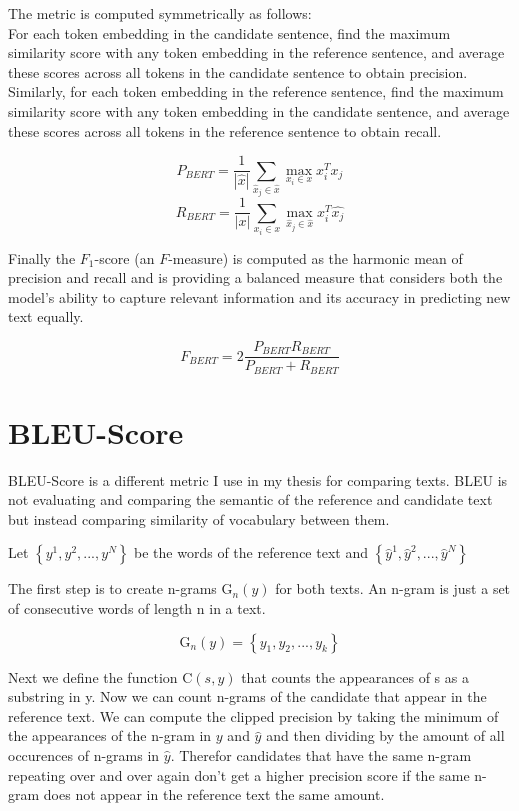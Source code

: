 The metric is computed symmetrically as follows:\\

For each token embedding in the candidate sentence, find the maximum similarity score with any token embedding in the reference sentence, and average these scores across all tokens in the candidate sentence to obtain precision.\\

Similarly, for each token embedding in the reference sentence, find the maximum similarity score with any token embedding in the candidate sentence, and average these scores across all tokens in the reference sentence to obtain recall.

\[P_{BERT} = \frac{1}{|\hat{x}|} \sum_{\hat{x}_j\in \hat{x}} \max_{x_i \in x} x_i^T \hat{x_j} \]
\[R_{BERT} = \frac{1}{|x|} \sum_{x_i \in x} \max_{\hat{x}_j\in \hat{x}} x_i^T \hat{x_j} \]



Finally the $F_1$-score (an $F$-measure)
is computed as the harmonic mean of precision and recall and is providing a balanced measure that considers both the model's ability to capture relevant information and its accuracy in predicting new text equally.

\[F_{BERT} = 2\frac{P_{BERT}R_{BERT}}{P_{BERT} + R_{BERT}} \]

\section{BLEU-Score}

BLEU-Score is a different metric I use in my thesis for comparing texts. BLEU is not evaluating and comparing the semantic of the reference and candidate text but instead comparing similarity of vocabulary between them.

Let $\left\{y^{1}, y^{2}, ..., y^{N}\right\}$ be the words of the reference text and $\left\{\hat{y}^{1}, \hat{y}^{2}, ..., \hat{y}^{N}\right\}$


The first step is to create n-grams $\text{G}_n(y)$ for both texts. An n-gram is just a set of consecutive words of length n in a text.

\[
    \text{G}_n(y) = \left\{y_1, y_2, ..., y_k\right\}
\]

Next we define the function $\text{C}(s,y)$ that counts the appearances of s as a substring in y.
Now we can count n-grams of the candidate that appear in the reference text. We can compute the clipped precision by taking the minimum of the appearances of the n-gram in $y$ and $\hat{y}$ and then dividing by the amount of all occurences of n-grams in $\hat{y}$. Therefor candidates that have the same n-gram repeating over and over again don't get a higher precision score if the same n-gram does not appear in the reference text the same amount.

